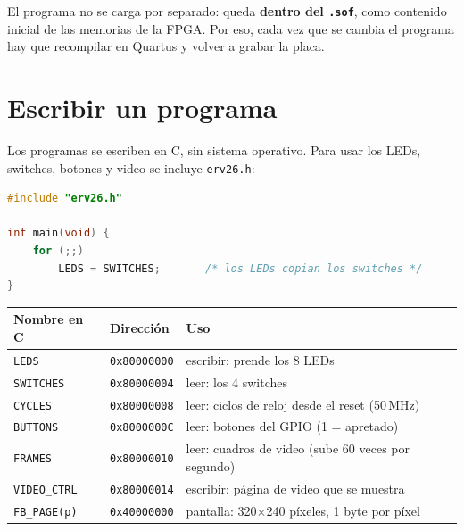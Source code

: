 \documentclass[11pt,a4paper]{article}
\newcommand{\code}[1]{\texttt{#1}}
\begin{document}
\begin{center}
\end{center}

El programa no se carga por separado: queda \textbf{dentro del \code{.sof}}, como contenido inicial de las memorias de la FPGA. Por eso, cada vez que se cambia el programa hay que recompilar en Quartus y volver a grabar la placa.

\section{Escribir un programa}

Los programas se escriben en C, sin sistema operativo. Para usar los LEDs, switches, botones y video se incluye \code{erv26.h}:

\noindent\begin{minipage}{\linewidth}
\begin{lstlisting}[language=C]
#include "erv26.h"

int main(void) {
    for (;;)
        LEDS = SWITCHES;       /* los LEDs copian los switches */
}
\end{lstlisting}
\end{minipage}

\begin{center}
\begin{tabular}{lll}
\toprule
Nombre en C & Dirección & Uso \\
\midrule
\code{LEDS} & \code{0x80000000} & escribir: prende los 8 LEDs \\
\code{SWITCHES} & \code{0x80000004} & leer: los 4 switches \\
\code{CYCLES} & \code{0x80000008} & leer: ciclos de reloj desde el reset (50\,MHz) \\
\code{BUTTONS} & \code{0x8000000C} & leer: botones del GPIO (1 = apretado) \\
\code{FRAMES} & \code{0x80000010} & leer: cuadros de video (sube 60 veces por segundo) \\
\code{VIDEO\_CTRL} & \code{0x80000014} & escribir: página de video que se muestra \\
\code{FB\_PAGE(p)} & \code{0x40000000} & pantalla: 320$\times$240 píxeles, 1 byte por píxel \\
\bottomrule
\end{tabular}
\end{center}
\end{document}
